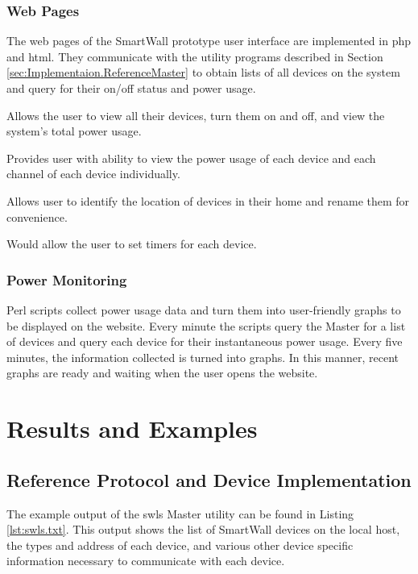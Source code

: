 \documentclass[11pt]{article}
\begin{document}
\subsubsection{Web Pages}
The web pages of the SmartWall prototype user interface are
implemented in php and html. They communicate with the utility
programs described in Section \ref{sec:Implementaion.ReferenceMaster}
to obtain lists of all devices on
the system and query for their on/off status and power usage.
\begin{description}
  \setlength{\itemsep}{0pt}
  \setlength{\parskip}{0pt}
  \setlength{\parsep}{0pt}
\item[Home Page:] Allows the user to view all their devices, turn them on and
off, and view the system’s total power usage.
\item[Energy Usage:] Provides user with ability to view the power usage
of each device and each channel of each device individually.
\item[Setup Page:] Allows user to identify the location of devices in their
home and rename them for convenience.
\item[Timers Page:] Would allow the user to set timers for each device.
\end{description}

\subsubsection{Power Monitoring}
Perl scripts collect power usage data and turn them into user-friendly
graphs to be displayed on the website. Every minute the scripts query
the Master for a list of devices and query each device for their
instantaneous power usage. Every five minutes, the information
collected is turned into graphs. In this manner, recent graphs are
ready and waiting when the user opens the website.

\section{Results and Examples}
\subsection{Reference Protocol and Device Implementation}

The example output of the swls Master utility can be found in Listing
\ref{lst:swls.txt}. This output shows the list of SmartWall devices on
the local host, the types and address of each device, and various
other device specific information necessary to communicate with each device.
\end{document}
